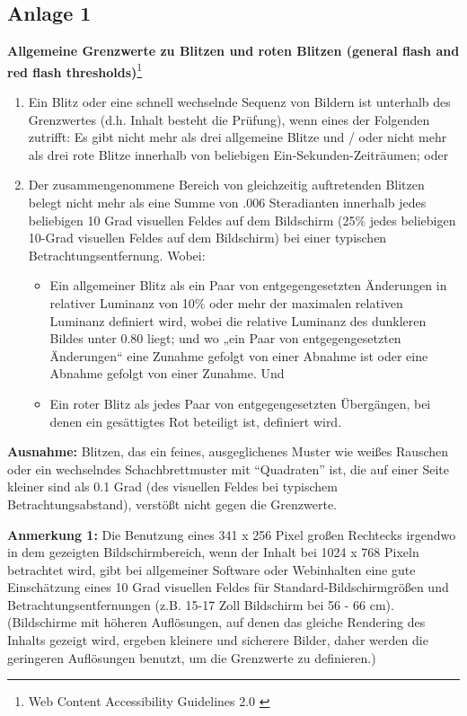 
\subsection*{Anlage 1}
\label{subsec: Anlage1}

\textbf{Allgemeine Grenzwerte zu Blitzen und roten Blitzen (general flash and red flash thresholds)}\footnote{Web Content Accessibility Guidelines 2.0 \cite{WCAG2.0}}

\begin{enumerate}
	\item Ein Blitz oder eine schnell wechselnde Sequenz von Bildern ist unterhalb des Grenzwertes (d.h. Inhalt besteht die Prüfung), wenn eines der Folgenden zutrifft:
	Es gibt nicht mehr als drei allgemeine Blitze und / oder nicht mehr als drei rote Blitze innerhalb von beliebigen Ein-Sekunden-Zeiträumen; oder

	\item Der zusammengenommene Bereich von gleichzeitig auftretenden Blitzen belegt nicht mehr als eine Summe von .006 Steradianten innerhalb jedes beliebigen 10 Grad 		visuellen Feldes auf dem Bildschirm (25\% jedes beliebigen 10-Grad visuellen Feldes auf dem Bildschirm) bei einer typischen Betrachtungsentfernung. Wobei:
	\begin{itemize}
		\item Ein allgemeiner Blitz als ein Paar von entgegengesetzten Änderungen in relativer Luminanz von 10\% oder mehr der maximalen relativen Luminanz definiert wird, 		wobei die relative Luminanz des dunkleren Bildes unter 0.80 liegt; und wo „ein Paar von entgegengesetzten Änderungen“ eine Zunahme gefolgt von einer Abnahme 				ist oder eine Abnahme gefolgt von einer Zunahme. Und
		\item Ein roter Blitz als jedes Paar von entgegengesetzten Übergängen, bei denen ein gesättigtes Rot beteiligt ist, definiert wird.
	\end{itemize}
\end{enumerate}

\textbf{Ausnahme:} Blitzen, das ein feines, ausgeglichenes Muster wie weißes Rauschen oder ein wechselndes Schachbrettmuster mit "`Quadraten"' ist, die auf einer Seite kleiner sind als 0.1 Grad (des visuellen Feldes bei typischem Betrachtungsabstand), verstößt nicht gegen die Grenzwerte.

\textbf{Anmerkung 1:} Die Benutzung eines 341 x 256 Pixel großen Rechtecks irgendwo in dem gezeigten Bildschirmbereich, wenn der Inhalt bei 1024 x 768 Pixeln betrachtet wird, gibt bei allgemeiner Software oder Webinhalten eine gute Einschätzung eines 10 Grad visuellen Feldes für Standard-Bildschirmgrößen und Betrachtungsentfernungen (z.B. 15-17 Zoll Bildschirm bei 56 - 66 cm). (Bildschirme mit höheren Auflösungen, auf denen das gleiche Rendering des Inhalts gezeigt wird, ergeben kleinere und sicherere Bilder, daher werden die geringeren Auflösungen benutzt, um die Grenzwerte zu definieren.)

